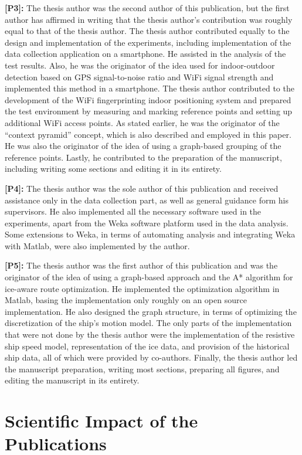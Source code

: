 \textbf{[P3]:} The thesis author was the second author of this publication, but the first author has affirmed in writing that the thesis author's contribution was roughly equal to that of the thesis author. The thesis author contributed equally to the design and implementation of the experiments, including implementation of the data collection application on a smartphone. He assisted in the analysis of the test results. Also, he was the originator of the idea used for indoor-outdoor detection based on GPS signal-to-noise ratio and WiFi signal strength and implemented this method in a smartphone. The thesis author contributed to the development of the WiFi fingerprinting indoor positioning system and prepared the test environment by measuring and marking reference points and setting up additional WiFi access points. As stated earlier, he was the originator of the ``context pyramid'' concept, which is also described and employed in this paper. He was also the originator of the idea of using a graph-based grouping of the reference points. Lastly, he contributed to the preparation of the manuscript, including writing some sections and editing it in its entirety.

\textbf{[P4]:} The thesis author was the sole author of this publication and received assistance only in the data collection part, as well as general guidance form his supervisors. He also implemented all the necessary software used in the experiments, apart from the Weka software platform used in the data analysis. Some extensions to Weka, in terms of automating analysis and integrating Weka with Matlab, were also implemented by the author.

\textbf{[P5]:} The thesis author was the first author of this publication and was the originator of the idea of using a graph-based approach and the A* algorithm for ice-aware route optimization. He implemented the optimization algorithm in Matlab, basing the implementation only roughly on an open source implementation. He also designed the graph structure, in terms of optimizing the discretization of the ship's motion model. The only parts of the implementation that were not done by the thesis author were the implementation of the resistive ship speed model, representation of the ice data, and provision of the historical ship data, all of which were provided by co-authors. Finally, the thesis author led the manuscript preparation, writing most sections, preparing all figures, and editing the manuscript in its entirety.

\section{Scientific Impact of the Publications}
\label{sec:impact}

